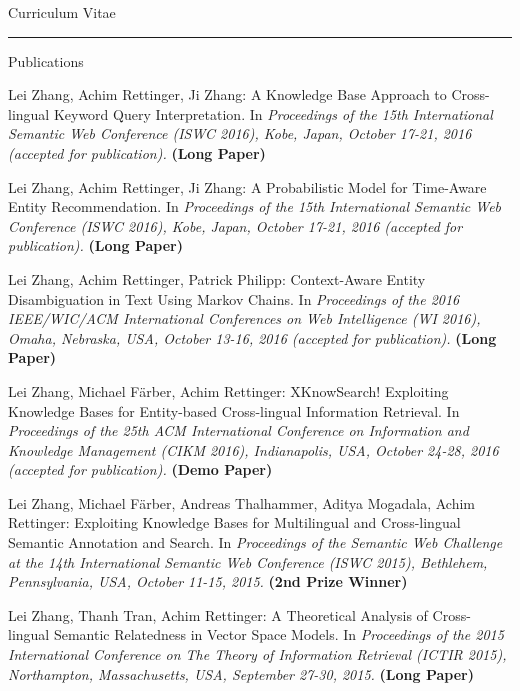 \begin{cv}{\centerline{\LARGE Curriculum Vitae}}
  \hrule

  \setlength{\cvlabelwidth}{0mm}
  \begin{cvlist}{Publications}
  \item[] 
    \begin{list}{}{\leftmargin=-1em}
    \item Lei Zhang, Achim Rettinger, Ji Zhang: A Knowledge Base Approach to Cross-lingual Keyword Query Interpretation. In \emph{Proceedings of the 15th International Semantic Web Conference (ISWC 2016), Kobe, Japan, October 17-21, 2016 (accepted for publication).}
    \textbf{(Long Paper)}
    
    \item Lei Zhang, Achim Rettinger, Ji Zhang: A Probabilistic Model for Time-Aware Entity Recommendation. In \emph{Proceedings of the 15th International Semantic Web Conference (ISWC 2016), Kobe, Japan, October 17-21, 2016 (accepted for publication).}
    \textbf{(Long Paper)}
    
    \item Lei Zhang, Achim Rettinger, Patrick Philipp: Context-Aware Entity Disambiguation in Text Using Markov Chains. In \emph{Proceedings of the 2016 IEEE/WIC/ACM International Conferences on Web Intelligence (WI 2016), Omaha, Nebraska, USA, October 13-16, 2016 (accepted for publication).}
    \textbf{(Long Paper)}
    
    \item Lei Zhang, Michael Färber, Achim Rettinger: XKnowSearch! Exploiting Knowledge Bases for Entity-based Cross-lingual Information Retrieval. In \emph{Proceedings of the 25th ACM International Conference on Information and Knowledge Management (CIKM 2016), Indianapolis, USA, October 24-28, 2016 (accepted for publication).}
    \textbf{(Demo Paper)}
    
    \item Lei Zhang, Michael Färber, Andreas Thalhammer, Aditya Mogadala, Achim Rettinger: Exploiting Knowledge Bases for Multilingual and Cross-lingual Semantic Annotation and Search. In \emph{Proceedings of the Semantic Web Challenge at the 14th International Semantic Web Conference (ISWC 2015), Bethlehem, Pennsylvania, USA, October 11-15, 2015.} 
    \textbf{(2nd Prize Winner)}
    
    \item Lei Zhang, Thanh Tran, Achim Rettinger: A Theoretical Analysis of Cross-lingual Semantic Relatedness in Vector Space Models. In \emph{Proceedings of the 2015 International Conference on The Theory of Information Retrieval (ICTIR 2015), Northampton, Massachusetts, USA, September 27-30, 2015.}
    \textbf{(Long Paper)}
    

\end{list}
\end{cvlist}
\end{cv}
